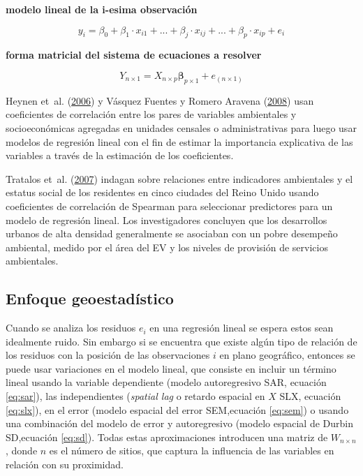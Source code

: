 \documentclass[12pt,a4paper,openany]{book}
\theoremstyle{definition}
\theoremstyle{definition}
\theoremstyle{definition}
\theoremstyle{remark}
\begin{document}
\textbf{modelo lineal de la i-esima observación}

\begin{equation}
y_i=\beta_0+ \beta_1\cdot  x_{i1}+...+\beta_j\cdot  x_{ij}+...+\beta_p\cdot  x_{ip}+e_i
\label{eq:lmodel}
\end{equation}

\textbf{forma matricial del sistema de ecuaciones a resolver}

\begin{equation}
Y_{n\times 1}=X_{n \times p }\mathbf{\beta}_{p\times 1}+e_{(n\times 1)}
\label{eq:lmodelM}
\end{equation}

Heynen et~al. (\protect\hyperlink{ref-heynen_political_2006}{2006}) y
Vásquez Fuentes y Romero Aravena
(\protect\hyperlink{ref-vasquez_fuentes_vegetacion_2008}{2008}) usan
coeficientes de correlación entre los pares de variables ambientales y
socioeconómicas agregadas en unidades censales o administrativas para
luego usar modelos de regresión lineal con el fin de estimar la
importancia explicativa de las variables a través de la estimación de
los coeficientes.

Tratalos et~al. (\protect\hyperlink{ref-tratalos_urban_2007}{2007})
indagan sobre relaciones entre indicadores ambientales y el estatus
social de los residentes en cinco ciudades del Reino Unido usando
coeficientes de correlación de Spearman para seleccionar predictores
para un modelo de regresión lineal. Los investigadores concluyen que los
desarrollos urbanos de alta densidad generalmente se asociaban con un
pobre desempeño ambiental, medido por el área del EV y los niveles de
provisión de servicios ambientales.

\subsection{Enfoque geoestadístico}\label{enfoque-geoestaduxedstico}

Cuando se analiza los residuos \(e_i\) en una regresión lineal se espera
estos sean idealmente ruido. Sin embargo si se encuentra que existe
algún tipo de relación de los residuos con la posición de las
observaciones \(i\) en plano geográfico, entonces se puede usar
variaciones en el modelo lineal, que consiste en incluir un término
lineal usando la variable dependiente (modelo autoregresivo SAR,
ecuación \eqref{eq:sar}), las independientes (\emph{spatial lag} o retardo
espacial en \(X\) SLX, ecuación \eqref{eq:slx}), en el error (modelo
espacial del error SEM,ecuación \eqref{eq:sem}) o usando una combinación
del modelo de error y autoregresivo (modelo espacial de Durbin
SD,ecuación \eqref{eq:sd}). Todas estas aproximaciones introducen una
matriz de \(W_{n\times n}\), donde \(n\) es el número de sitios, que
captura la influencia de las variables en relación con su proximidad.
\end{document}
